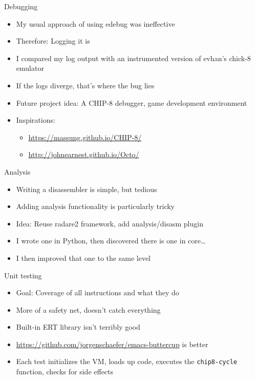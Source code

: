 \documentclass[presentation]{beamer}
\begin{document}
\begin{frame}[label={sec:orgad9ca80}]{Debugging}
\begin{itemize}
\item My usual approach of using edebug was ineffective
\item Therefore: Logging it is
\item I compared my log output with an instrumented version of evhan's
chick-8 emulator
\item If the logs diverge, that's where the bug lies
\item Future project idea: A CHIP-8 debugger, game development environment
\item Inspirations:
\begin{itemize}
\item \url{https://massung.github.io/CHIP-8/}
\item \url{http://johnearnest.github.io/Octo/}
\end{itemize}
\end{itemize}
\end{frame}

\begin{frame}[label={sec:orgcb068dc}]{Analysis}
\begin{itemize}
\item Writing a disassembler is simple, but tedious
\item Adding analysis functionality is particularly tricky
\item Idea: Reuse radare2 framework, add analysis/disasm plugin
\item I wrote one in Python, then discovered there is one in core\ldots{}
\item I then improved that one to the same level
\end{itemize}
\end{frame}

\begin{frame}[fragile,label={sec:org5f540a0}]{Unit testing}
 \begin{itemize}
\item Goal: Coverage of all instructions and what they do
\item More of a safety net, doesn't catch everything
\item Built-in ERT library isn't terribly good
\item \url{https://github.com/jorgenschaefer/emacs-buttercup} is better
\item Each test initializes the VM, loads up code, executes the
\texttt{chip8-cycle} function, checks for side effects
\end{itemize}
\end{frame}
\end{document}
